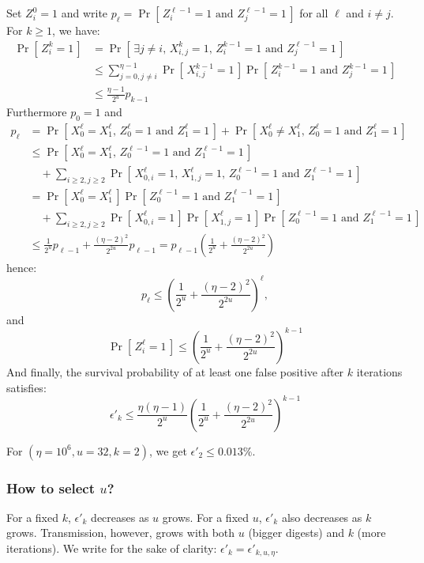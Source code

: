 \documentclass[11pt]{llncs}
\newcommand{\Prob}[1]{{\Pr\left[\,{#1}\,\right]}}
\begin{document}
Set $Z^0_i = 1$ and write $p_\ell = \Prob{Z^{\ell-1}_{i} = 1 \text{ and } Z^{\ell-1}_{j} = 1} $ for all $\ell$ and $i \neq j$.
For $k \ge 1$, we have:
\begin{align*}
\Prob{Z^k_i=1} &= \Prob{\exists j\neq i \text{, } X^k_{i,j} = 1 \text{, } Z^{k-1}_{i} = 1  \text{ and } Z^{\ell-1}_{j} = 1}  \\
&\le \sum_{j=0, j\neq i}^{\eta-1} \Prob{X^{k-1}_{i,j} = 1} \Prob{Z^{k-1}_{i} = 1 \text{ and } Z^{k-1}_{j} = 1}  \\
&\le \frac{\eta-1}{2^u} p_{k-1}
\end{align*}
Furthermore $p_0 = 1$ and
\begin{align*}
p_\ell &= \Prob{X^{\ell}_0 = X^{\ell}_1 \text{, } Z^{\ell}_{0} = 1 \text{ and } Z^{\ell}_{1} = 1}
  + \Prob{X^{\ell}_0 \neq X^{\ell}_1 \text{, } Z^{\ell}_{0} = 1 \text{ and } Z^{\ell}_{1} = 1} \\
&\le \Prob{X^{\ell}_0 = X^{\ell}_1 \text{, } Z^{\ell-1}_{0} = 1 \text{ and } Z^{\ell-1}_{1} = 1} \\
  &\quad+ \sum_{i \ge 2, j \ge 2} \Prob{X^\ell_{0,i} = 1 \text{, } X^\ell_{1,j} = 1 \text{, } Z^{\ell-1}_{0} = 1 \text{ and } Z^{\ell-1}_{1} = 1} \\
&= \Prob{X^{\ell}_0 = X^{\ell}_1} \Prob{Z^{\ell-1}_{0} = 1 \text{ and } Z^{\ell-1}_{1} = 1} \\
  &\quad+ \sum_{i \ge 2, j \ge 2} \Prob{X^\ell_{0,i} = 1} \Prob{X^\ell_{1,j} = 1} \Prob{Z^{\ell-1}_{0} = 1 \text{ and } Z^{\ell-1}_{1} = 1} \\
&\le \frac{1}{2^u} p_{\ell-1} + \frac{(\eta-2)^2}{2^{2u}} p_{\ell-1} = p_{\ell-1}\left(\frac{1}{2^u}  + \frac{(\eta-2)^2}{2^{2u}}\right)
\end{align*}
hence:
\[ p_\ell \le \left( \frac{1}{2^u} + \frac{(\eta-2)^2}{2^{2u}} \right)^\ell, \]
and
\[ \Prob{Z^\ell_i=1} \le \left( \frac{1}{2^u} + \frac{(\eta-2)^2}{2^{2u}} \right)^{k-1} \]
And finally, the survival probability of at least one false positive after $k$ iterations satisfies:
\[
\epsilon'_k \le \frac{\eta(\eta-1)}{2^u} \left( \frac{1}{2^u} + \frac{(\eta-2)^2}{2^{2u}} \right)^{k-1}
\]

For $(\eta=10^6,u=32,k=2)$, we get $\epsilon'_2 \le 0.013\%$.\smallskip

\subsubsection{How to select $u$?}

For a fixed $k$, $\epsilon'_k$ decreases as $u$ grows. For a fixed $u$, $\epsilon'_k$ also decreases as $k$ grows. Transmission, however, grows with both $u$ (bigger digests) and $k$ (more iterations). We write for the sake of clarity: $\epsilon'_k = \epsilon'_{k,u,\eta}$.\smallskip
\end{document}
